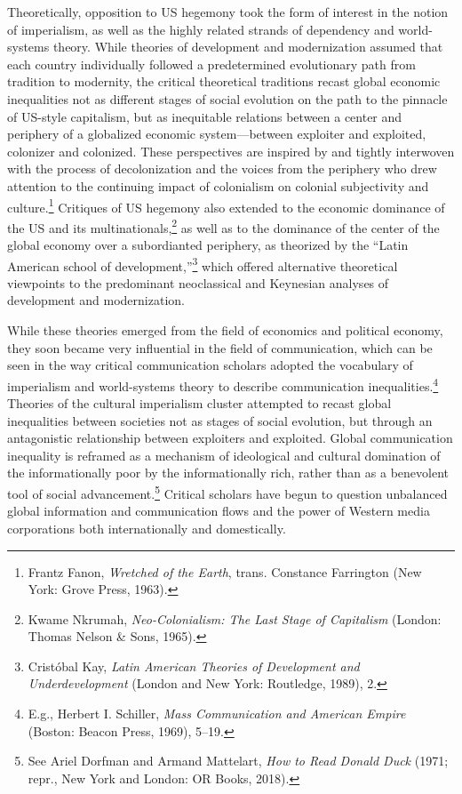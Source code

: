 \documentclass{tufte-handout}
\begin{document}
Theoretically, opposition to US hegemony took the form of interest in
the notion of imperialism, as well as the highly related strands of
dependency and world-systems theory. While theories of development and
modernization assumed that each country individually followed a
predetermined evolutionary path from tradition to modernity, the
critical theoretical traditions recast global economic inequalities not
as different stages of social evolution on the path to the pinnacle of
US-style capitalism, but as inequitable relations between a center and
periphery of a globalized economic system---between exploiter and
exploited, colonizer and colonized. These perspectives are inspired by
and tightly interwoven with the process of decolonization and the voices
from the periphery who drew attention to the continuing impact of
colonialism on colonial subjectivity and culture.\footnote{Frantz Fanon,
  \emph{Wretched of the Earth}, trans. Constance Farrington (New York:
  Grove Press, 1963).} Critiques of US hegemony also extended to the
economic dominance of the US and its multinationals,\footnote{Kwame
  Nkrumah, \emph{Neo-Colonialism: The Last Stage of Capitalism} (London:
  Thomas Nelson \& Sons, 1965).} as well as to the dominance of the
center of the global economy over a subordianted periphery, as theorized
by the ``Latin American school of development,''\footnote{Cristóbal Kay,
  \emph{Latin American Theories of Development and Underdevelopment}
  (London and New York: Routledge, 1989), 2.} which offered alternative
theoretical viewpoints to the predominant neoclassical and Keynesian
analyses of development and modernization.

\enlargethispage{\baselineskip}

While these theories emerged from the field of economics and political
economy, they soon became very influential in the field of
communication, which can be seen in the way critical communication
scholars adopted the vocabulary of imperialism and world-systems theory
to describe communication inequalities.\footnote{E.g., Herbert I.
  Schiller, \emph{Mass Communication and American Empire} (Boston:
  Beacon Press, 1969), 5--19.} Theories of the cultural imperialism
cluster attempted to recast global inequalities between societies not as
stages of social evolution, but through an antagonistic relationship
between exploiters and exploited. Global communication inequality is
reframed as a mechanism of ideological and cultural domination of the
informationally poor by the informationally rich, rather than as a
benevolent tool of social advancement.\footnote{See Ariel Dorfman and
  Armand Mattelart, \emph{How to Read Donald Duck} (1971; repr., New
  York and London: OR Books, 2018).} Critical scholars have begun to
question unbalanced global information and communication flows and the
power of Western media corporations both internationally and
domestically.
\end{document}
